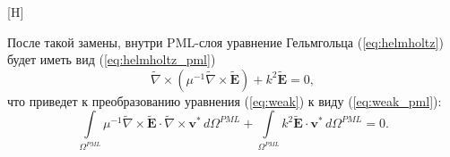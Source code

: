 \documentclass[a4paper,14pt]{article}
\makeatletter
\renewenvironment{figure}[1][\fps@figure]{
  \edef\@tempa{\noexpand\@float{figure}[#1]}
  \@tempa
  \addtocounter{foofigure}{1}
}{
  \end@float
}
\makeatother
\begin{document}
\begin{figure}[H]
	\centering
	\caption{расчетные области: (а) без PML-слоя и (б) с PML-слоем}
	\label{fig:theory:area_3layers_PML}
\end{figure}

После такой замены, внутри PML-слоя уравнение Гельмгольца (\ref{eq:helmholtz}) будет иметь вид (\ref{eq:helmholtz_pml})
\begin{equation}
	\tilde{\nabla} \times ( \mu^{-1} \tilde{\nabla} \times \tilde{\mathbf{E}} ) + k^{2} \tilde{\mathbf{E}} = 0 , \label{eq:helmholtz_pml}
\end{equation}
что приведет к преобразованию уравнения (\ref{eq:weak}) к виду (\ref{eq:weak_pml}):
\begin{equation}
	\int\limits_{{\Omega^{PML}}} \mu^{-1} \tilde{\nabla} \times \tilde{\mathbf{E}} \cdot \tilde{\nabla} \times \mathbf{v}^{*} \,d{\Omega^{PML}} + \int\limits_{{\Omega^{PML}}} k^{2} \tilde{\mathbf{E}} \cdot \mathbf{v}^{*} \,d{\Omega^{PML}} = 0 . \label{eq:weak_pml}
\end{equation}
\end{document}
